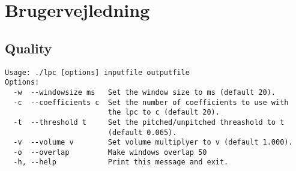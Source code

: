 \section{Brugervejledning}
\subsection*{Quality}
\begin{verbatim}
Usage: ./lpc [options] inputfile outputfile
Options:
  -w  --windowsize ms   Set the window size to ms (default 20).
  -c  --coefficients c  Set the number of coefficients to use with 
                        the lpc to c (default 20).
  -t  --threshold t     Set the pitched/unpitched threashold to t 
                        (default 0.065).
  -v  --volume v        Set volume multiplyer to v (default 1.000).
  -o  --overlap         Make windows overlap 50
  -h, --help            Print this message and exit.
\end{verbatim}
